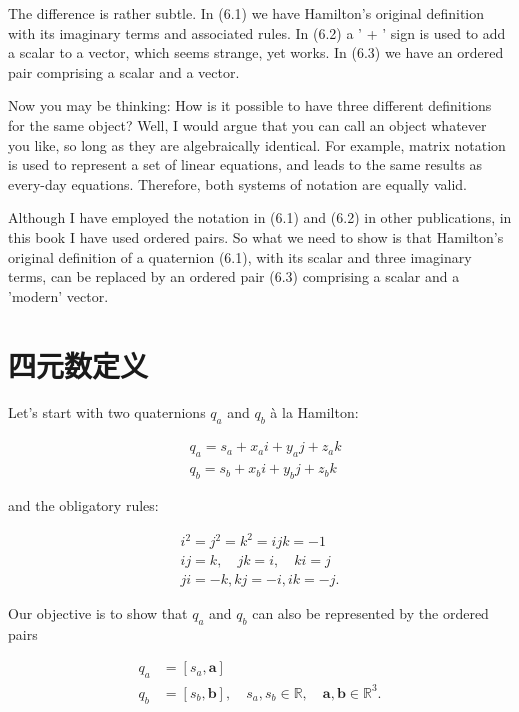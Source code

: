 The difference is rather subtle. In (6.1) we have Hamilton's original definition with its imaginary terms and associated rules. In (6.2) a ' + ' sign is used to add a scalar to a vector, which seems strange, yet works. In (6.3) we have an ordered pair comprising a scalar and a vector.

Now you may be thinking: How is it possible to have three different definitions for the same object? Well, I would argue that you can call an object whatever you like, so long as they are algebraically identical. For example, matrix notation is used to represent a set of linear equations, and leads to the same results as every-day equations. Therefore, both systems of notation are equally valid.

Although I have employed the notation in (6.1) and (6.2) in other publications, in this book I have used ordered pairs. So what we need to show is that Hamilton's original definition of a quaternion (6.1), with its scalar and three imaginary terms, can be replaced by an ordered pair (6.3) comprising a scalar and a 'modern' vector.

\section{四元数定义}
Let's start with two quaternions $q_{a}$ and $q_{b}$ à la Hamilton:

$$
    \begin{aligned}
         & q_{a}=s_{a}+x_{a} i+y_{a} j+z_{a} k \\
         & q_{b}=s_{b}+x_{b} i+y_{b} j+z_{b} k
    \end{aligned}
$$

and the obligatory rules:

$$
    \begin{gathered}
        i^{2}=j^{2}=k^{2}=i j k=-1 \\
        i j=k, \quad j k=i, \quad k i=j \\
        j i=-k, k j=-i, i k=-j .
    \end{gathered}
$$

Our objective is to show that $q_{a}$ and $q_{b}$ can also be represented by the ordered pairs

$$
    \begin{aligned}
        q_{a} & =\left[s_{a}, \mathbf{a}\right]                                                                                       \\
        q_{b} & =\left[s_{b}, \mathbf{b}\right], \quad s_{a}, s_{b} \in \mathbb{R}, \quad \mathbf{a}, \mathbf{b} \in \mathbb{R}^{3} .
    \end{aligned}
$$

